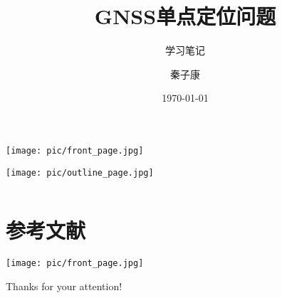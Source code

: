 \documentclass{beamer}
\author{秦子康}
\title{GNSS单点定位问题}
\subtitle{学习笔记}
\institute{安徽肇立科技有限公司}
\date{\today}
\begin{document}
\kaishu

{
{
    \texttt{[image: pic/front\_page.jpg]}
}
\begin{frame}
    \titlepage
\end{frame}
}

{
{
    \texttt{[image: pic/outline\_page.jpg]}
}
\begin{frame}
\begin{columns}
    \tableofcontents[sectionstyle=show,subsectionstyle=show/shaded/hide,subsubsectionstyle=show/shaded/hide]
\end{columns}
\end{frame}
}







\section{参考文献}

\begin{frame}[allowframebreaks]
    
    
\end{frame}

{
{
    \texttt{[image: pic/front\_page.jpg]}
}
\begin{frame}
    \begin{center}
        {\Huge\calligra Thanks for your attention!}
    \end{center}
\end{frame}
}
\end{document}
